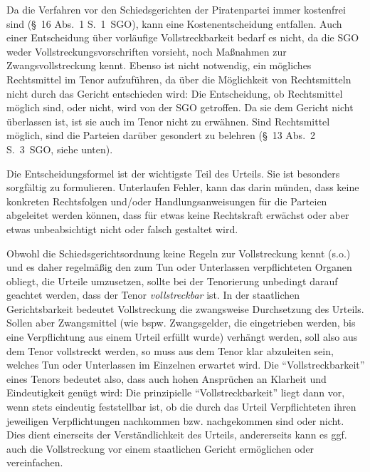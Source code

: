 Da die Verfahren vor den Schiedsgerichten der Piratenpartei immer kostenfrei sind (\S~16 Abs.~1 S.~1~SGO), kann eine Kostenentscheidung entfallen. Auch einer Entscheidung über vorläufige Vollstreckbarkeit bedarf es nicht, da die SGO weder Vollstreckungsvorschriften vorsieht, noch Maßnahmen zur Zwangsvollstreckung kennt. Ebenso ist nicht notwendig, ein mögliches Rechtsmittel im Tenor aufzuführen, da über die Möglichkeit von Rechtsmitteln nicht durch das Gericht entschieden wird: Die Entscheidung, ob Rechtsmittel möglich sind, oder nicht, wird von der SGO getroffen. Da sie dem Gericht nicht überlassen ist, ist sie auch im Tenor nicht zu erwähnen. Sind Rechtsmittel möglich, sind die Parteien darüber gesondert zu belehren (\S~13 Abs.~2 S.~3~SGO, siehe unten).

Die Entscheidungsformel ist der wichtigste Teil des Urteils. Sie ist besonders sorgfältig zu formulieren. Unterlaufen Fehler, kann das darin münden, dass keine konkreten Rechtsfolgen und/oder Handlungsanweisungen für die Parteien abgeleitet werden können, dass für etwas keine Rechtskraft erwächst oder aber etwas unbeabsichtigt nicht oder falsch gestaltet wird.

Obwohl die Schiedsgerichtsordnung keine Regeln zur Vollstreckung kennt (s.o.) und es daher regelmäßig den zum Tun oder Unterlassen verpflichteten Organen obliegt, die Urteile umzusetzen, sollte bei der Tenorierung unbedingt darauf geachtet werden, dass der Tenor \emph{vollstreckbar} ist. In der staatlichen Gerichtsbarkeit bedeutet Vollstreckung die zwangsweise Durchsetzung des Urteils. Sollen aber Zwangsmittel (wie bspw. Zwangsgelder, die eingetrieben werden, bis eine Verpflichtung aus einem Urteil erfüllt wurde) verhängt werden, soll also aus dem Tenor vollstreckt werden, so muss aus dem Tenor klar abzuleiten sein, welches Tun oder Unterlassen im Einzelnen erwartet wird. Die \enquote{Vollstreckbarkeit} eines Tenors bedeutet also, dass auch hohen Ansprüchen an Klarheit und Eindeutigkeit genügt wird: Die prinzipielle \enquote{Vollstreckbarkeit} liegt dann vor, wenn stets eindeutig feststellbar ist, ob die durch das Urteil Verpflichteten ihren jeweiligen Verpflichtungen nachkommen bzw. nachgekommen sind oder nicht. Dies dient einerseits der Verständlichkeit des Urteils, andererseits kann es ggf. auch die Vollstreckung vor einem staatlichen Gericht ermöglichen oder vereinfachen.


